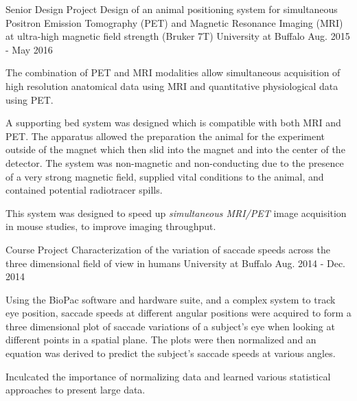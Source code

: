\begin{cventries}
  \cventry
    {Senior Design Project} %
    {Design of an animal positioning system for simultaneous Positron Emission Tomography (PET) and Magnetic Resonance Imaging (MRI) at ultra-high magnetic field strength (Bruker 7T)} %
    {University at Buffalo} %
    {Aug. 2015 - May 2016} %
    {
      \begin{cvitems} %
        \item {The combination of PET and MRI modalities allow simultaneous acquisition of high resolution anatomical data using MRI and quantitative physiological data using PET.}
        \item {A supporting bed system was designed which is compatible with both MRI and PET. The apparatus allowed the preparation the animal for the experiment outside of the magnet which then slid into the magnet and into the center of the detector. The system was non-magnetic and non-conducting due to the presence of a very strong magnetic field, supplied vital conditions to the animal, and contained potential radiotracer spills.}
        \item {This system was designed to speed up \emph{simultaneous MRI/PET} image acquisition in mouse studies, to improve imaging throughput.}
      \end{cvitems}
    }

  \cventry
    {Course Project} %
    {Characterization of the variation of saccade speeds across the three dimensional field of view in humans} %
    {University at Buffalo} %
    {Aug. 2014 - Dec. 2014} %
    {
      \begin{cvitems} %
        \item {Using the BioPac software and hardware suite, and a complex system to track eye position, saccade speeds at different angular positions were acquired to form a three dimensional plot of saccade variations of a subject’s eye when looking at different points in a spatial plane. The plots were then normalized and an equation was derived to predict the subject's saccade speeds at various angles.}
        \item {Inculcated the importance of normalizing data and learned various  statistical approaches to present large data.}
      \end{cvitems}
    }

\end{cventries}
